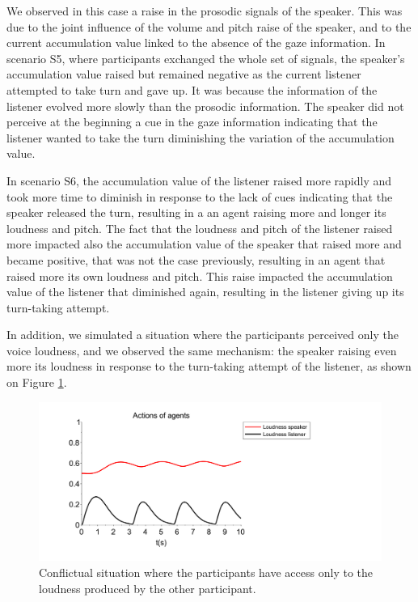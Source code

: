 We observed in this case a raise in the prosodic signals of the speaker. This was due to the joint influence of the volume and pitch raise of the speaker, and to the current accumulation value linked to the absence of the gaze information. 
In scenario S5, where participants exchanged the whole set of signals, the speaker's accumulation value raised but remained negative as the current listener attempted to take turn and gave up. It was because the information of the listener evolved more slowly than the prosodic information. The speaker did not perceive at the beginning a cue in the gaze information indicating that the listener wanted to take the turn diminishing the variation of the accumulation value. 

In scenario S6, the accumulation value of the listener raised more rapidly and took more time to diminish in response to the lack of cues indicating that the speaker released the turn, resulting in a an agent raising more and longer its loudness and pitch. The fact that the loudness and pitch of the listener raised more impacted also the accumulation value of the speaker that raised more and became positive, that was not the case previously, resulting in an agent that raised more its own loudness and pitch. This raise impacted the accumulation value of the listener that diminished again, resulting in the listener giving up its turn-taking attempt. 

In addition, we simulated a situation where the participants perceived only the voice loudness, and we observed the same mechanism: the speaker raising even more its loudness in response to the turn-taking attempt of the listener, as shown on Figure \ref{adapt_volume}.

\begin{figure}
\centering
\includegraphics[width=\linewidth]{figure/adapt_volume.pdf}
\caption{Conflictual situation where the participants have access only to the loudness produced by the other participant.}
\label{adapt_volume}
\end{figure}


